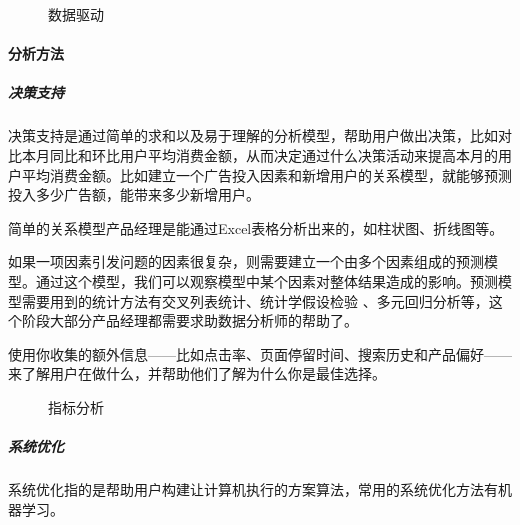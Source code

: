 \documentclass[letterpaper,11pt,english]{sphinxmanual}
\begin{document}
\begin{figure}[H]
\centering
\capstart

\noindent{}
\caption{数据驱动}\label{\detokenize{chapter_knowledge/data_analysis:id20}}\end{figure}


\paragraph{分析方法}
\label{\detokenize{chapter_knowledge/data_analysis:id5}}

\subparagraph{决策支持}
\label{\detokenize{chapter_knowledge/data_analysis:id6}}
决策支持是通过简单的求和以及易于理解的分析模型，帮助用户做出决策，比如对比本月同比和环比用户平均消费金额，从而决定通过什么决策活动来提高本月的用户平均消费金额。比如建立一个广告投入因素和新增用户的关系模型，就能够预测投入多少广告额，能带来多少新增用户。

简单的关系模型产品经理是能通过Excel表格分析出来的，如柱状图、折线图等。

如果一项因素引发问题的因素很复杂，则需要建立一个由多个因素组成的预测模型。通过这个模型，我们可以观察模型中某个因素对整体结果造成的影响。预测模型需要用到的统计方法有交叉列表统计、统计学假设检验
、多元回归分析等，这个阶段大部分产品经理都需要求助数据分析师的帮助了。

使用你收集的额外信息——比如点击率、页面停留时间、搜索历史和产品偏好——来了解用户在做什么，并帮助他们了解为什么你是最佳选择。
%
\begin{footnote}[575]\sphinxAtStartFootnote
{}
%
\end{footnote}

\begin{figure}[H]
\centering
\capstart

\noindent{}
\caption{指标分析\sphinxfootnotemark[576]}\label{\detokenize{chapter_knowledge/data_analysis:id21}}\end{figure}
%
\begin{footnotetext}[576]\sphinxAtStartFootnote
{}
%
\end{footnotetext}\ignorespaces 

\subparagraph{系统优化}
\label{\detokenize{chapter_knowledge/data_analysis:id7}}
系统优化指的是帮助用户构建让计算机执行的方案算法，常用的系统优化方法有机器学习。
\end{document}
